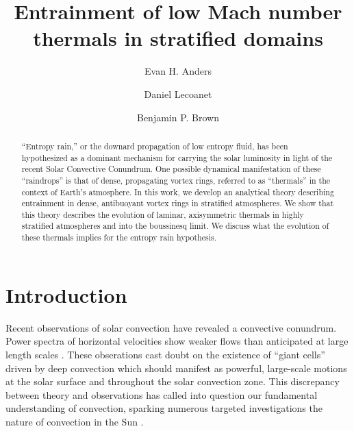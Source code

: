 \documentclass[twocolumn, amsmath, amsfonts, amssymb, trackchanges]{aastex62}
\begin{document}
\title{Entrainment of low Mach number thermals in stratified domains}


\author[0000-0002-3433-4733]{Evan H. Anders}
\author[0000-0002-7635-9728]{Daniel Lecoanet}
\author[0000-0001-8935-219X]{Benjamin P. Brown}


\begin{abstract}
``Entropy rain,'' or the downard propagation of low entropy fluid, has been hypothesized as a dominant mechanism for carrying the solar luminosity in light of the recent Solar Convective Conundrum.
One possible dynamical manifestation of these ``raindrops'' is that of dense, propagating vortex rings, referred to as ``thermals'' in the context of Earth's atmosphere.
In this work, we develop an analytical theory describing entrainment in dense, antibuoyant vortex rings in stratified atmospheres.
We show that this theory describes the evolution of laminar, axisymmetric thermals in highly stratified atmospheres and into the boussinesq limit.
We discuss what the evolution of these thermals implies for the entropy rain hypothesis.
\end{abstract}


\section{Introduction}
\label{sec:intro}
Recent observations of solar convection have revealed a convective conundrum.
Power spectra of horizontal velocities show weaker flows than anticipated at large length scales \citep{hanasoge&all2012, greer&all2015}.
These obserations cast doubt on the existence of ``giant cells'' driven by deep convection which should manifest as powerful, large-scale motions at the solar surface and throughout the solar convection zone. 
This discrepancy between theory and observations has called into question our fundamental understanding of convection, sparking numerous targeted investigations the nature of convection in the Sun  \citep{featherstone&hindman2016, omara&all2016, cossette&rast2016, kapyla&all2017, hotta2017}.
\end{document}
